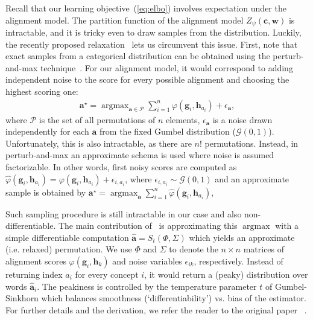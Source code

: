 \documentclass[11pt,a4paper]{article}
\DeclareMathOperator*{\argmax}{argmax}
\begin{document}
Recall that our learning objective~(\ref{eq:elbo}) involves expectation under the alignment model. The partition function of the alignment model $Z_{\psi} (\mathbf{c}, \mathbf{w})$  is intractable, and it is tricky even to draw samples from the distribution. Luckily, the recently proposed relaxation~\cite{sinkhorn} lets us circumvent this issue. First, note that exact samples from a categorical distribution can be obtained using the perturb-and-max technique~\cite{papandreou2011perturb}. For our alignment model, it would correspond to adding independent noise to the score for every possible alignment and choosing the highest scoring one:
\begin{align}
\label{eq:argmax}
\mathbf{a^{\star}} = \argmax_{\mathbf{a} \in \mathcal{P}}{\sum_{i=1}^{n}{\varphi(\mathbf{g}_i, \mathbf{h}_{a_i})} + \epsilon_{\mathbf{a}}},
\end{align}
where $\mathcal{P}$ is the set of all permutations of $n$ elements,
$\epsilon_{\mathbf{a}}$ is a noise drawn independently for each $\mathbf{a}$ from the fixed Gumbel distribution ($\mathcal{G}(0,1)$). Unfortunately, this is also intractable, as there are $n!$ permutations. Instead, in perturb-and-max
an approximate schema is used where noise is assumed factorizable. In other words, first noisy scores are computed as $\hat{\varphi}(\mathbf{g}_i, \mathbf{h}_{a_i}) = {\varphi}(\mathbf{g}_i, \mathbf{h}_{a_i}) + \epsilon_{i, a_i}$, where $\epsilon_{i, a_i} \sim \mathcal{G}(0,1)$ and an approximate sample is obtained by
$\mathbf{a^{\star}} = \argmax_{\mathbf{a}}{\sum_{i=1}^{n}{\hat{\varphi}(\mathbf{g}_i, \mathbf{h}_{a_i})}},$

Such sampling procedure is still intractable in our case and also non-differentiable.
The main contribution of~ is approximating this $\argmax$
with a simple differentiable computation $\hat{\mathbf{a}} = S_t(\Phi, \Sigma)$ which yields an approximate (i.e. relaxed) permutation. We use $\Phi$ and $\Sigma$ to denote the $n \times n$ matrices of alignment scores $\varphi(\mathbf{g}_i, \mathbf{h}_{k})$ and noise variables $\epsilon_{ik}$, respectively.  Instead of returning index $a_i$ for every concept $i$,  it would return a (peaky) distribution over words $\hat{\mathbf{a}}_i$. The peakiness is controlled by the temperature parameter $t$ of Gumbel-Sinkhorn  which balances smoothness (`differentiability') vs. bias of the estimator. 
For further details and the derivation, we refer the reader to the original paper ~\cite{sinkhorn}.
\end{document}
